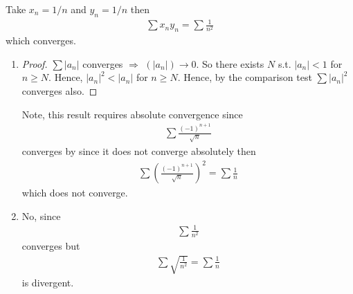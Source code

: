 Take $x_n=1/n$ and $y_n=1/n$ then 
\begin{align*}
    \sum x_n y_n = \sum \frac{1}{n^2}
\end{align*}
which converges.

\begin{enumerate}[label=(\alph*)]
    \item 
    \begin{proof}
        $\sum |a_n|$ converges $\Rightarrow$ $(|a_n|)\rightarrow 0$.
        So there exists $N$ s.t. $|a_n|<1$ for $n \geq N$.
        Hence, $|a_n|^2 < |a_n|$ for $n \geq N$. Hence, by the comparison
        test $\sum |a_n|^2$ converges also.
    \end{proof}

    Note, this result requires absolute convergence since
    \begin{align*}
        \sum \frac{(-1)^{n+1}}{\sqrt{n}}
    \end{align*}
    converges by since it does not converge absolutely then
    \begin{align*}
        \sum \left( \frac{(-1)^{n+1}}{\sqrt{n}} \right)^2 = \sum \frac{1}{n}
    \end{align*}
    which does not converge.

    \item
    No, since 
    \begin{align*}
        \sum \frac{1}{n^2}
    \end{align*}
    converges but 
    \begin{align*}
        \sum \sqrt{\frac{1}{n^2}} = \sum \frac{1}{n}
    \end{align*}
    is divergent.
\end{enumerate}

